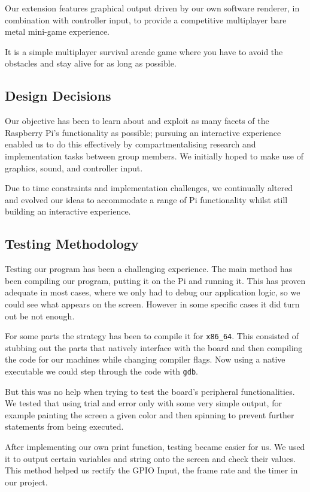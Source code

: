 \documentclass[11pt]{article}
\begin{document}
Our extension features graphical output driven by our own software renderer, in
combination with controller input, to provide a competitive multiplayer bare
metal mini-game experience.

It is a simple multiplayer survival arcade game where you have to avoid the
obstacles and stay alive for as long as possible.

\subsection{Design Decisions}

Our objective has been to learn about and exploit as many facets of the
Raspberry Pi's functionality as possible; pursuing an interactive experience
enabled us to do this effectively by compartmentalising research and
implementation tasks between group members. We initially hoped to make use of
graphics, sound, and controller input.

Due to time constraints and implementation challenges, we continually altered
and evolved our ideas to accommodate a range of Pi functionality whilst still
building an interactive experience.

\subsection{Testing Methodology}

Testing our program has been a challenging experience. The main method has been
compiling our program, putting it on the Pi and running it. This has proven
adequate in most cases, where we only had to debug our application logic, so we
could see what appears on the screen. However in some specific cases it did turn
out be not enough.

For some parts the strategy has been to compile it for \texttt{x86\_64}. This
consisted of stubbing out the parts that natively interface with the board and
then compiling the code for our machines while changing compiler flags. Now
using a native executable we could step through the code with \texttt{gdb}.

But this was no help when trying to test the board's peripheral functionalities.
We tested that using trial and error only with some very simple output, for
example painting the screen a given color and then spinning to prevent further
statements from being executed.

After implementing our own print function, testing became easier for us.
We used it to output certain variables and string onto the screen and check
their values. This method helped us rectify the GPIO Input, the frame rate and the
timer in our project.
\end{document}
